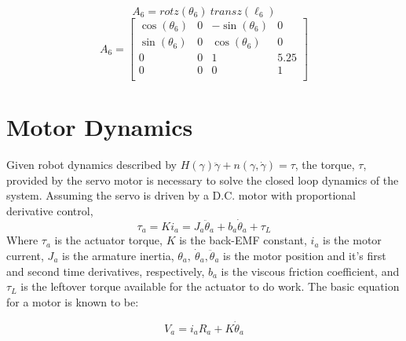 \documentclass[12pt]{report}
\begin{document}
\vspace{.25ex}
\[
A_6 = rotz(\theta_6) ~ transz(\ell_6)
\]
\vspace{.5ex}
\[
A_6 =
\begin{bmatrix}
  \cos(\theta_6) & 0 & -\sin(\theta_6) & 0 \\
  \sin(\theta_6) & 0 & \cos(\theta_6) & 0 \\
  0 & 0 & 1 & 5.25 \\
  0 & 0 & 0 & 1 \\
\end{bmatrix}
\]

\newpage

\section{Motor Dynamics}
Given robot dynamics described by \(H(\gamma)\ddot{\gamma} + n(\gamma,\dot{\gamma}) = \tau\), the torque, $\tau$, provided by the servo motor is necessary to solve the closed loop dynamics of the system. Assuming the servo is driven by a D.C. motor with proportional derivative control,
\begin{equation}
  \tau_a = Ki_a = J_a\ddot{\theta}_a + b_a\dot{\theta}_a + \tau_L
  \label{eq:pd}
\end{equation}
Where $\tau_a$ is the actuator torque, $K$ is the back-EMF constant, $i_a$ is the motor current, $J_a$ is the armature inertia, $\theta_a,~\dot{\theta}_a,\ddot{\theta}_a$ is the motor position and it's first and second time derivatives, respectively, $b_a$ is the viscous friction coefficient, and $\tau_L$ is the leftover torque available for the actuator to do work. The basic equation for a motor is known to be:

\begin{equation}
  V_a = i_aR_a + K\dot{\theta}_a
  \label{eq:va}
\end{equation}
\end{document}
